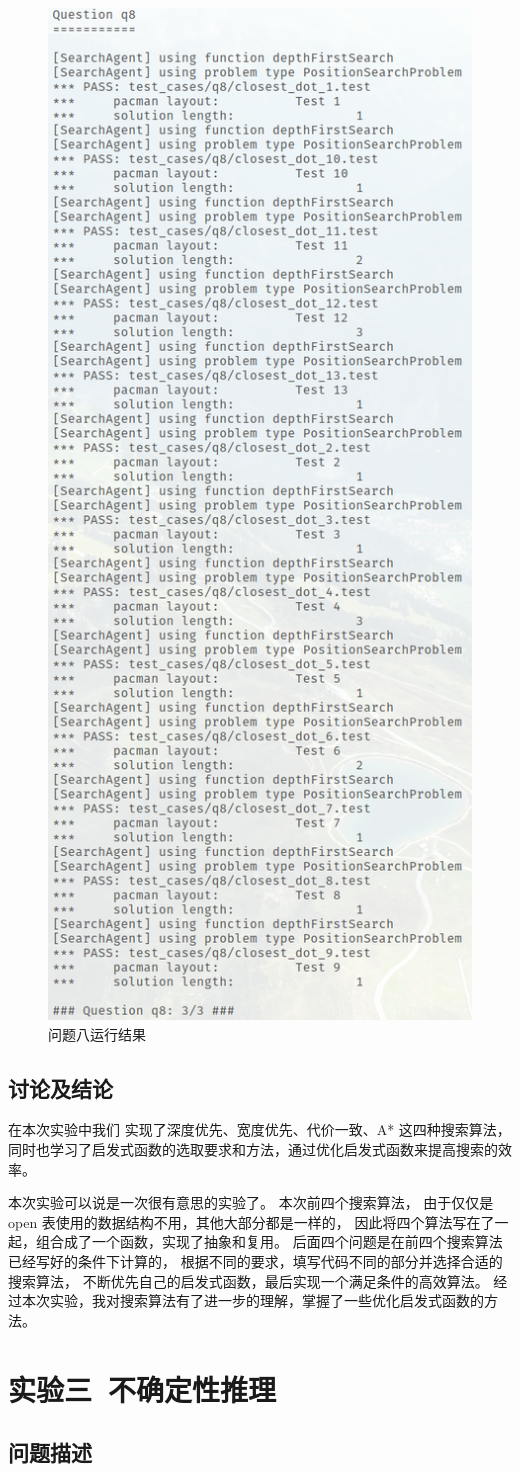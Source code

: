 \documentclass[12pt,onecolumn]{report}
\theoremstyle{plain}
\numberwithin{figure}{section}
\begin{document}
\begin{figure}[H]
  \centering
  \includegraphics[width=0.4\linewidth]{figures/q8.png}
  \caption{问题八运行结果}
\end{figure}

\section{讨论及结论}
在本次实验中我们
实现了深度优先、宽度优先、代价一致、A* 这四种搜索算法，
同时也学习了启发式函数的选取要求和方法，通过优化启发式函数来提高搜索的效率。

本次实验可以说是一次很有意思的实验了。
本次前四个搜索算法，
由于仅仅是 open 表使用的数据结构不用，其他大部分都是一样的，
因此将四个算法写在了一起，组合成了一个函数，实现了抽象和复用。
后面四个问题是在前四个搜索算法已经写好的条件下计算的，
根据不同的要求，填写代码不同的部分并选择合适的搜索算法，
不断优先自己的启发式函数，最后实现一个满足条件的高效算法。
经过本次实验，我对搜索算法有了进一步的理解，掌握了一些优化启发式函数的方法。

\chapter{实验三~不确定性推理}
\section{问题描述}
\end{document}
